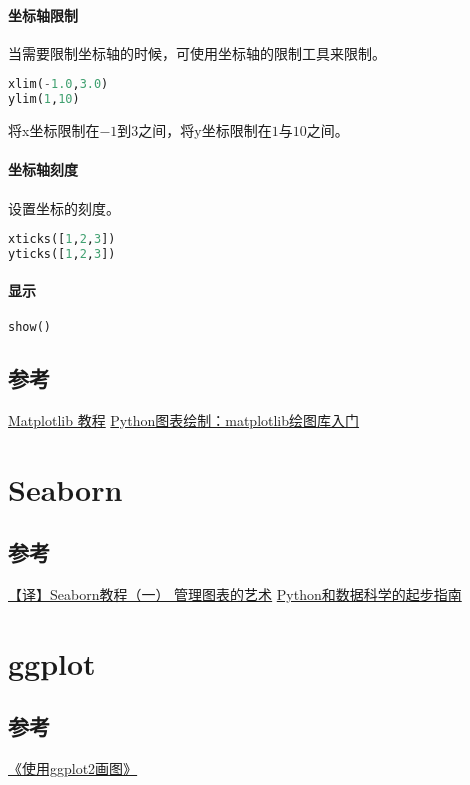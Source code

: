 \documentclass{ctexart}
\begin{document}
\paragraph{坐标轴限制}
当需要限制坐标轴的时候，可使用坐标轴的限制工具来限制。
\begin{lstlisting}[language=python]
xlim(-1.0,3.0)
ylim(1,10)
\end{lstlisting}
将x坐标限制在$-1$到$3$之间，将y坐标限制在$1$与$10$之间。

\paragraph{坐标轴刻度}
设置坐标的刻度。
\begin{lstlisting}[language=python]
xticks([1,2,3])
yticks([1,2,3])
\end{lstlisting}

\paragraph{显示}
\begin{lstlisting}[language=python]
show()
\end{lstlisting}


\subsection{参考}
\href{http://liam0205.me/2014/09/11/matplotlib-tutorial-zh-cn/}{Matplotlib 教程}
\href{http://blog.csdn.net/ywjun0919/article/details/8692018}{Python图表绘制：matplotlib绘图库入门}


\section{Seaborn}
\subsection{参考}
\href{https://segmentfault.com/a/1190000005092460}{【译】Seaborn教程（一） 管理图表的艺术}
\href{http://python.jobbole.com/80853}{Python和数据科学的起步指南}

\section{ggplot}
\subsection{参考}
\href{https://www.plob.org/article/7264.html}{《使用ggplot2画图》}
\end{document}
